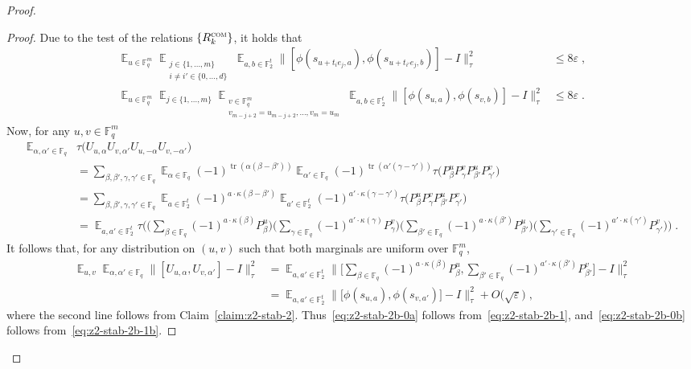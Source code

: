 \documentclass[11pt]{article}
\theoremstyle{definition}
\newcommand{\Id}{\ensuremath{I}}
\DeclareMathOperator*{\Expectation}{\mathbb{E}}
\newcommand{\Es}[1]{\Expectation_{#1}}
\newcommand{\F}{\ensuremath{\mathbb{F}}}
\newcommand{\com}{\textsc{com}}
\newcommand{\eps}{\varepsilon}
\DeclareMathOperator{\tr}{tr}
\begin{document}
\begin{proof}
\begin{proof}
Due to the test of the relations $\{R^\com_k\}$, it holds that 
\begin{align}
\Es{u\in \F_q^m} \Es{\substack{j\in\{1,\ldots,m\} \\ i\neq i' \in \{0,\ldots,d\}}} \Es{a,b\in \F_2^t} \big\| [\phi(s_{u+t_i e_j,a}),\phi(s_{u+t_{i'} e_j,b})] - \Id \big\|_\tau^2&\leq 8\eps\; ,\label{eq:z2-stab-2b-1}\\
\Es{u\in \F_q^m} \Es{j\in\{1,\ldots,m\}} \Es{\substack{v\in \F_q^m \\v_{m-j+2}=u_{m-j+2},\ldots,v_m=u_m}}\Es{a,b\in \F_2^t} \big\| [\phi(s_{u,a}),\phi(s_{v,b})]-\Id\big\|_\tau^2&\leq 8\eps\;.\label{eq:z2-stab-2b-1b}
\end{align}
Now, for any $u,v\in \F_q^m$
\begin{align*}
\Es{\alpha,\alpha'\in \F_q} &\tau\big( U_{u,\alpha} U_{v,\alpha'} U_{u,-\alpha} U_{v,-\alpha'} \big) \\
&= \sum_{\beta,\beta',\gamma,\gamma'\in \F_q}\Es{\alpha\in \F_q} (-1)^{\tr(\alpha(\beta-\beta'))} \Es{\alpha'\in \F_q} (-1)^{\tr(\alpha'(\gamma-\gamma'))}  \tau(P^{u}_\beta P^{v}_\gamma P^{u}_{\beta'} P^{v}_{\gamma'}\big)\\
&=\sum_{\beta,\beta',\gamma,\gamma'\in \F_q}\Es{a\in\F_2^t} (-1)^{a\cdot\kappa(\beta-\beta')} \Es{a'\in\F_2^t} (-1)^{a'\cdot\kappa(\gamma-\gamma')} \tau(P^{u}_\beta P^{v}_\gamma P^{u}_{\beta'} P^{v}_{\gamma'}\big)\\
&=\Es{a,a'\in\F_2^t}  \tau\Big( \Big(\sum_{\beta\in \F_q} (-1)^{a\cdot \kappa(\beta)} P^{u}_\beta\Big) \Big(\sum_{\gamma\in \F_q} (-1)^{a'\cdot \kappa(\gamma)} P^{v}_\gamma\Big)\Big(\sum_{\beta'\in \F_q} (-1)^{a\cdot \kappa(\beta')} P^{u}_{\beta'}\Big)\Big(\sum_{\gamma'\in \F_q} (-1)^{a'\cdot \kappa(\gamma')} P^{v}_{\gamma'}\Big)\Big)\;.
\end{align*}
It follows that, for any distribution on $(u,v)$ such that both marginals are uniform over $\F_q^m$,
\begin{align*}
\Es{u,v} \Es{\alpha,\alpha'\in \F_q} \big\| [U_{u,\alpha} ,U_{v,\alpha'} ]-\Id\big\|_\tau^2
&= \Es{a,a'\in \F_2^t} \Big\| \Big[\sum_{\beta\in \F_q} (-1)^{a\cdot \kappa(\beta)} P^{u}_\beta ,\sum_{\beta'\in \F_q} (-1)^{a'\cdot \kappa(\beta')} P^{v}_{\beta'} \Big]-\Id\Big\|_\tau^2\\
&= \Es{a,a'\in \F_2^t} \big\| \big[ \phi(s_{u,a}),\phi(s_{v,a'})\big]-\Id\big\|_\tau^2+O\big(\sqrt{\eps}\big)\;,
\end{align*}
where the second line follows from Claim~\ref{claim:z2-stab-2}. Thus~\eqref{eq:z2-stab-2b-0a} follows from~\eqref{eq:z2-stab-2b-1}, and~\eqref{eq:z2-stab-2b-0b} follows from~\eqref{eq:z2-stab-2b-1b}.
\end{proof}


\end{proof}
\end{document}
